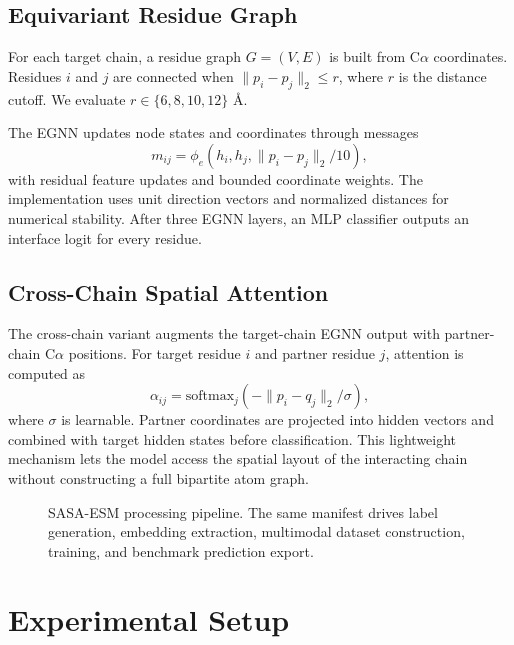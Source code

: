 \documentclass[runningheads]{llncs}
\begin{document}
\subsection{Equivariant Residue Graph}

For each target chain, a residue graph \(G=(V,E)\) is built from C\(\alpha\)
coordinates. Residues \(i\) and \(j\) are connected when
\(\|p_i-p_j\|_2 \le r\), where \(r\) is the distance cutoff. We evaluate
\(r\in\{6,8,10,12\}\) \AA{}.

The EGNN updates node states and coordinates through messages
\[
  m_{ij} = \phi_e(h_i, h_j, \|p_i-p_j\|_2/10),
\]
with residual feature updates and bounded coordinate weights. The implementation uses
unit direction vectors and normalized distances for numerical stability. After three
EGNN layers, an MLP classifier outputs an interface logit for every residue.

\subsection{Cross-Chain Spatial Attention}

The cross-chain variant augments the target-chain EGNN output with partner-chain C\(\alpha\)
positions. For target residue \(i\) and partner residue \(j\), attention is computed as
\[
  \alpha_{ij} =
  \mathrm{softmax}_j(-\|p_i-q_j\|_2/\sigma),
\]
where \(\sigma\) is learnable. Partner coordinates are projected into hidden vectors and
combined with target hidden states before classification. This lightweight mechanism
lets the model access the spatial layout of the interacting chain without constructing a
full bipartite atom graph.

\begin{figure}[t]
\centering
{}
\caption{SASA-ESM processing pipeline. The same manifest drives label generation,
embedding extraction, multimodal dataset construction, training, and benchmark
prediction export.}
\label{fig:pipeline}
\end{figure}

\section{Experimental Setup}
\end{document}
